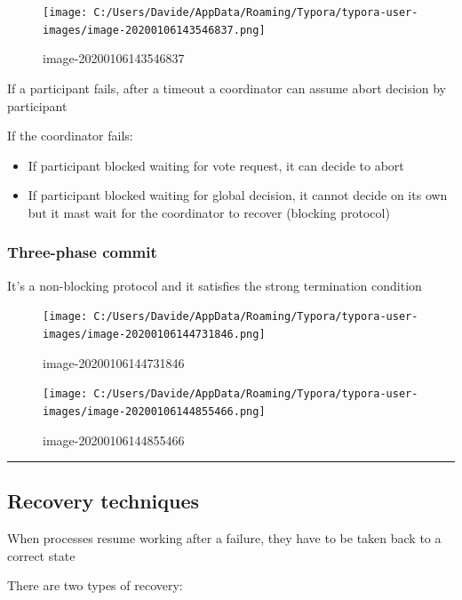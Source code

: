 \begin{figure}[htbp]
\centering
\texttt{[image: C:/Users/Davide/AppData/Roaming/Typora/typora-user-images/image-20200106143546837.png]}
\caption{image-20200106143546837}
\end{figure}

If a participant fails, after a timeout a coordinator can assume abort
decision by participant

If the coordinator fails:

\begin{itemize}
\itemsep1pt\parskip0pt
\item
  If participant blocked waiting for vote request, it can decide to
  abort
\item
  If participant blocked waiting for global decision, it cannot decide
  on its own but it mast wait for the coordinator to recover (blocking
  protocol)
\end{itemize}

\subsubsection{Three-phase commit}\label{three-phase-commit}

It's a non-blocking protocol and it satisfies the strong termination
condition

\begin{figure}[htbp]
\centering
\texttt{[image: C:/Users/Davide/AppData/Roaming/Typora/typora-user-images/image-20200106144731846.png]}
\caption{image-20200106144731846}
\end{figure}

\begin{figure}[htbp]
\centering
\texttt{[image: C:/Users/Davide/AppData/Roaming/Typora/typora-user-images/image-20200106144855466.png]}
\caption{image-20200106144855466}
\end{figure}

\begin{center}\rule{3in}{0.4pt}\end{center}

\subsection{Recovery techniques}\label{recovery-techniques}

When processes resume working after a failure, they have to be taken
back to a correct state

There are two types of recovery:

